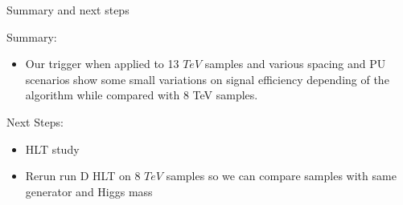 \documentclass[8pt]{beamer}
\begin{document}
\begin{frame}{Summary and next steps}
 
\begin{block}{Summary:}
 
\begin{itemize}
  \item Our trigger when applied to 13 $TeV$ samples and various spacing and PU scenarios show some small variations on signal efficiency depending of the algorithm while compared with 8 TeV samples. 
\end{itemize}

\end{block}

\begin{block}{Next Steps:}
 
\begin{itemize}
  \item HLT study 
  \item Rerun run D HLT on 8 $TeV$ samples so we can compare samples with same generator and Higgs mass
\end{itemize}
 
\end{block}

\end{frame}
\end{document}
